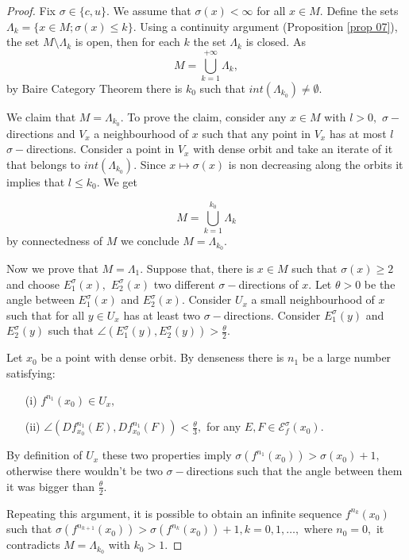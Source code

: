 \documentclass[12pt,reqno]{amsart}
\numberwithin{equation}{section}
\theoremstyle{plain}
\theoremstyle{remark}
\begin{document}
\begin{proof}
Fix $\sigma\in \{c,u\}.$ We assume that $\sigma(x)<\infty$ for all $x\in M.$ Define the sets
$\Lambda_k=\{x\in M; \sigma(x)\leq k\}.$ Using a continuity argument (Proposition \ref{prop 07}), the set  $M\setminus \Lambda_k$ is open, then for each $k$  the set $\Lambda_k$ is closed.
 As
$$
M=\bigcup_{k=1}^{+\infty}\Lambda_k,
$$
by Baire Category Theorem there is $k_0$ such that $int(\Lambda_{k_0})\neq \emptyset.$

We claim that $M=\Lambda_{k_0}.$
To prove the claim, consider any $x\in M$ with $l>0,$  $\sigma-$directions and $V_x$ a neighbourhood
of $x$ such that any point in $V_x$ has at most $l$ $\sigma-$directions. Consider a point
in $V_x$ with dense orbit and take an iterate of it that belongs to $int(\Lambda_{k_0}).$
Since $x \mapsto\sigma(x)$ is non decreasing along the orbits it implies that $l\leq k_0.$ We get

$$
M=\bigcup_{k=1}^{k_0}\Lambda_k
$$
by connectedness of $M$ we conclude $M=\Lambda_{k_0}.$

Now we prove that $M=\Lambda_{1}.$ Suppose that, there is $x\in M$ such that \mbox{$\sigma(x)\geq 2$}
and choose $E^{\sigma}_1(x),$ $E^{\sigma}_2(x)$ two different $\sigma-$directions of $x.$
Let $\theta>0$ be the angle between  $E^{\sigma}_1(x)$ and $E^{\sigma}_2(x).$
Consider $U_x$ a small neighbourhood of $x$ such that for all $y\in U_x$ has at least two $\sigma-$directions.
Consider $E^{\sigma}_1(y)$ and $E^{\sigma}_2(y)$ such that $\angle(E^{\sigma}_1(y),E^{\sigma}_2(y))>\frac{\theta}{2}.$

Let $x_0$ be a point with dense orbit. By denseness there is $n_1$ be a large number satisfying:

\begin{itemize}
\item[(i)] $f^{n_1}(x_0)\in U_x,$
\item[(ii)] $\angle(Df^{n_1}_{x_0}(E),Df^{n_1}_{x_0}(F))<\frac{\theta}{3},$ for any $E,F\in \mathcal{E}^{\sigma}_f(x_0).$
\end{itemize}

By definition of $U_x$ these two properties imply  $\sigma(f^{n_1}(x_0))>\sigma(x_0)+1,$ otherwise there wouldn't be two $\sigma-$directions such that the angle between them it was bigger than $\frac{\theta}{2}.$


Repeating this argument, it is possible to obtain an infinite sequence $f^{n_k}(x_0)$ such that $\sigma(f^{n_{k+1}}(x_0))>\sigma(f^{n_k}(x_0))+1, k =0,1,\ldots,$ where $n_0 = 0,$ it contradicts $M=\Lambda_{k_0}$ with $k_0>1.$


\end{proof}
\end{document}
